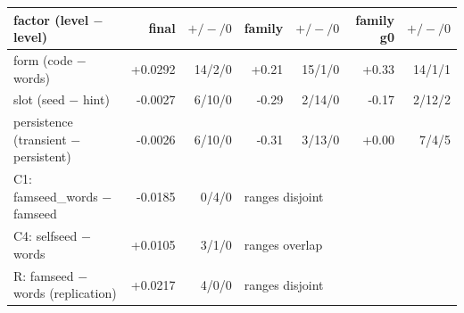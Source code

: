 \begin{tabular}{l rr rr rr}
\toprule
factor (level $-$ level) & final & $+/-/0$ & family & $+/-/0$ & family g0 & $+/-/0$ \\
\midrule
form (code $-$ words) & +0.0292 & 14/2/0 & +0.21 & 15/1/0 & +0.33 & 14/1/1 \\
slot (seed $-$ hint) & -0.0027 & 6/10/0 & -0.29 & 2/14/0 & -0.17 & 2/12/2 \\
persistence (transient $-$ persistent) & -0.0026 & 6/10/0 & -0.31 & 3/13/0 & +0.00 & 7/4/5 \\
\midrule
C1: famseed\_words $-$ famseed & -0.0185 & 0/4/0 & \multicolumn{4}{l}{ranges disjoint} \\
C4: selfseed $-$ words & +0.0105 & 3/1/0 & \multicolumn{4}{l}{ranges overlap} \\
R: famseed $-$ words (replication) & +0.0217 & 4/0/0 & \multicolumn{4}{l}{ranges disjoint} \\
\bottomrule
\end{tabular}
